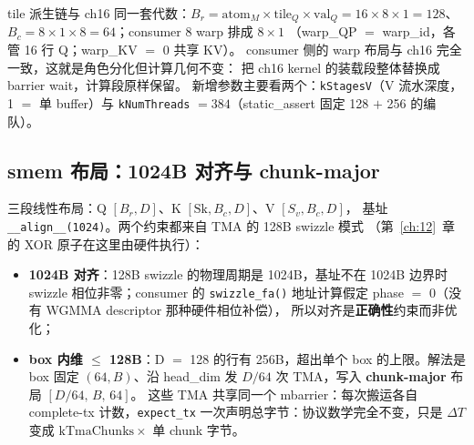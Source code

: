 

tile 派生链与 ch16 同一套代数：$B_r = \mathrm{atom}_M \times
\mathrm{tile}_Q \times \mathrm{val}_Q = 16 \times 8 \times 1 = 128$、
$B_c = 8 \times 1 \times 8 = 64$；consumer 8 warp 排成 $8 \times 1$
（warp\_QP $=$ warp\_id，各管 16 行 Q；warp\_KV $=$ 0 共享 KV）。
consumer 侧的 warp 布局与 ch16 完全一致，这就是角色分化但计算几何不变：
把 ch16 kernel 的装载段整体替换成 barrier wait，计算段原样保留。
新增参数主要看两个：\texttt{kStagesV}（V 流水深度，1 $=$ 单 buffer）与
\texttt{kNumThreads} $= 384$（static\_assert 固定 128 $+$ 256 的编队）。

\subsection{smem 布局：1024B 对齐与 chunk-major}



三段线性布局：Q $[B_r, D]$、K $[\mathrm{Sk}, B_c, D]$、V $[S_v, B_c, D]$，
基址 \texttt{\_\allowbreak{}\_\allowbreak{}align\_\allowbreak{}\_\allowbreak{}(1024)}。两个约束都来自 TMA 的 128B swizzle 模式
（第~\ref{ch:12}~章的 XOR 原子在这里由硬件执行）：

\begin{itemize}
  \item \textbf{1024B 对齐}：128B swizzle 的物理周期是 1024B，基址不在
        1024B 边界时 swizzle 相位非零；consumer 的 \texttt{swizzle\_\allowbreak{}fa\allowbreak{}()}
        地址计算假定 phase $=$ 0（没有 WGMMA descriptor 那种硬件相位补偿），
        所以对齐是\textbf{正确性}约束而非优化；
  \item \textbf{box 内维 $\le$ 128B}：D $=$ 128 的行有 256B，超出单个
        box 的上限。解法是 box 固定 $(64, B)$、沿 head\_dim 发
        $D/64$ 次 TMA，写入 \textbf{chunk-major} 布局 $[D/64,\, B,\, 64]$。
        这些 TMA 共享同一个 mbarrier：每次搬运各自 complete-tx
        计数，\texttt{expect\_tx} 一次声明总字节：协议数学完全不变，只是
        $\Delta T$ 变成 $\mathrm{kTmaChunks} \times$ 单 chunk 字节。
\end{itemize}

